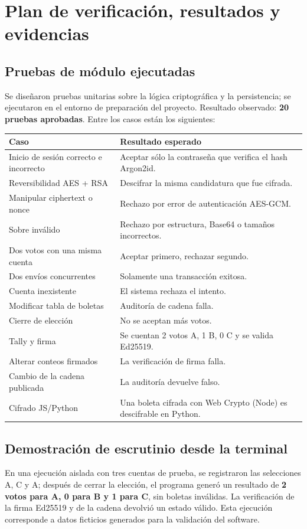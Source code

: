 \section{Plan de verificación, resultados y evidencias}
\subsection{Pruebas de módulo ejecutadas}
Se diseñaron pruebas unitarias sobre la lógica criptográfica y la persistencia; se ejecutaron en el entorno de preparación del proyecto. Resultado observado: \textbf{20 pruebas aprobadas}. Entre los casos están los siguientes:

\begin{longtable}{p{4.2cm}p{8.9cm}}
\toprule Caso & Resultado esperado\\\midrule\endhead
Inicio de sesión correcto e incorrecto & Aceptar sólo la contraseña que verifica el hash Argon2id.\\
Reversibilidad AES + RSA & Descifrar la misma candidatura que fue cifrada.\\
Manipular ciphertext o nonce & Rechazo por error de autenticación AES-GCM.\\
Sobre inválido & Rechazo por estructura, Base64 o tamaños incorrectos.\\
Dos votos con una misma cuenta & Aceptar primero, rechazar segundo.\\
Dos envíos concurrentes & Solamente una transacción exitosa.\\
Cuenta inexistente & El sistema rechaza el intento.\\
Modificar tabla de boletas & Auditoría de cadena falla.\\
Cierre de elección & No se aceptan más votos.\\
Tally y firma & Se cuentan 2 votos A, 1 B, 0 C y se valida Ed25519.\\
Alterar conteos firmados & La verificación de firma falla.\\
Cambio de la cadena publicada & La auditoría devuelve falso.\\
Cifrado JS/Python & Una boleta cifrada con Web Crypto (Node) es descifrable en Python.\\
\bottomrule
\end{longtable}

\subsection{Demostración de escrutinio desde la terminal}
En una ejecución aislada con tres cuentas de prueba, se registraron las selecciones A, C y A; después de cerrar la elección, el programa generó un resultado de \textbf{2 votos para A, 0 para B y 1 para C}, sin boletas inválidas. La verificación de la firma Ed25519 y de la cadena devolvió un estado válido. Esta ejecución corresponde a datos ficticios generados para la validación del software.


